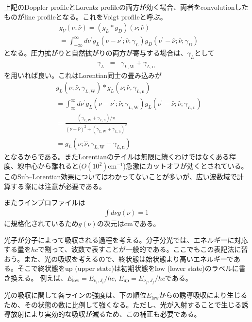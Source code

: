 上記のDoppler profileとLorentz profileの両方が効く場合、両者をconvolutionしたものがline profileとなる。これをVoigt profileと呼ぶ。
\begin{align}
&g_V(\nu;\hat{\nu}) = ( g_L \ast g_D )(\nu; \hat{\nu}) \nonumber \\ &= \int_{-\infty}^\infty d \nu^\prime g_L(\nu - \nu^\prime;\hat{\nu};\gamma_L) g_D(\nu^\prime - \hat{\nu};\hat{\nu};\gamma_D) 
\label{eq:voigt}
\end{align}
となる。圧力拡がりと自然拡がりの両方が寄与する場合は、$\gamma_L$として
\begin{eqnarray}
\label{eq:sumgamma}
\gamma_L &=& \gamma_{L, \mathrm{W}} + \gamma_{L, \mathrm{n}}
\end{eqnarray}
を用いれば良い。これはLorentian同士の畳み込みが
\begin{align}
&g_L(\nu;\hat{\nu},\gamma_{L,\mathrm{W}}) \ast g_L(\nu;\hat{\nu},\gamma_{L,\mathrm{n}}) \nonumber \\ &= \int_\infty^\infty d \nu^\prime g_L(\nu - \nu^\prime;\hat{\nu};\gamma_{L,\mathrm{W}}) g_L(\nu^\prime - \hat{\nu};\hat{\nu};\gamma_{L,\mathrm{n}}) \\
&= \frac{(\gamma_{L,\mathrm{W}}+\gamma_{L,\mathrm{n}})/\pi}{(\nu - \hat{\nu})^2  + (\gamma_{L,\mathrm{W}}+\gamma_{L,\mathrm{n}})^2} \nonumber \\
&= g_L(\nu;\hat{\nu},\gamma_{L,\mathrm{W}}+\gamma_{L,\mathrm{n}})
\label{eq:voigt2}
\end{align}
となるからである。またLorentianのテイルは無限に続くわけではなくある程度、線中心から離れると($O(10^2) \mathrm{cm^{-1}}$)急激にカットオフが効くとされている。このSub--Lorentian効果についてはわかってないことが多いが、広い波数域で計算する際には注意が必要である。


またラインプロファイルは
\begin{align}
    \int d \nu g(\nu) = 1 
\end{align}
に規格化されているため$g(\nu)$の次元は$\mathrm{cm}$である。

光子が分子によって吸収される過程を考える。分子分光では、エネルギーに対応する量を$hc$で割って、波数で表すことが一般的である。ここでもこの表記法に習おう。また、光の吸収を考えるので、終状態は始状態より高いエネルギーである。そこで終状態を$\mathrm{up}$ (upper state)は初期状態を$\mathrm{low}$ (lower state)のラベルに書き換える。
例えば、$E_\mathrm{low} = E_{\nu_i, J_i}/hc$, $E_\mathrm{up} = E_{\nu_f, J_f}/hc$である。

光の吸収に関して各ラインの強度は、下の順位$E_\mathrm{low} $からの誘導吸収により生じるため、その状態の数に比例して強くなる。ただし、光が入射することで生じる誘導放射により実効的な吸収が減るため、この補正も必要である。

